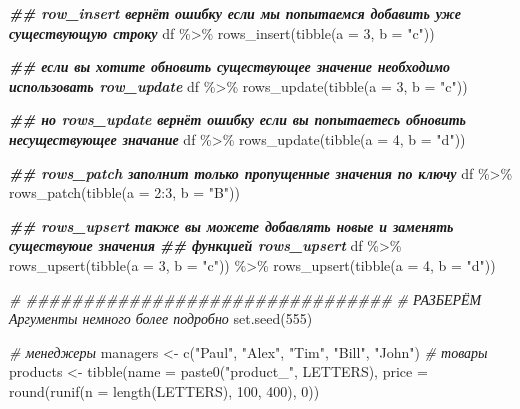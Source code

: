 \documentclass[
]{book}
\newenvironment{Shaded}{\begin{snugshade}}{\end{snugshade}}
\newcommand{\AttributeTok}[1]{\textcolor[rgb]{0.77,0.63,0.00}{#1}}
\newcommand{\CommentTok}[1]{\textcolor[rgb]{0.56,0.35,0.01}{\textit{#1}}}
\newcommand{\DecValTok}[1]{\textcolor[rgb]{0.00,0.00,0.81}{#1}}
\newcommand{\DocumentationTok}[1]{\textcolor[rgb]{0.56,0.35,0.01}{\textbf{\textit{#1}}}}
\newcommand{\FunctionTok}[1]{\textcolor[rgb]{0.00,0.00,0.00}{#1}}
\newcommand{\NormalTok}[1]{#1}
\newcommand{\OtherTok}[1]{\textcolor[rgb]{0.56,0.35,0.01}{#1}}
\newcommand{\SpecialCharTok}[1]{\textcolor[rgb]{0.00,0.00,0.00}{#1}}
\newcommand{\StringTok}[1]{\textcolor[rgb]{0.31,0.60,0.02}{#1}}
\begin{document}
\begin{Shaded}
\begin{Highlighting}[]
\DocumentationTok{\#\# row\_insert вернёт ошибку если мы попытаемся добавить уже существующую строку}
\NormalTok{df }\SpecialCharTok{\%\textgreater{}\%} \FunctionTok{rows\_insert}\NormalTok{(}\FunctionTok{tibble}\NormalTok{(}\AttributeTok{a =} \DecValTok{3}\NormalTok{, }\AttributeTok{b =} \StringTok{"c"}\NormalTok{))}

\DocumentationTok{\#\# если вы хотите обновить существующее значение необходимо использовать row\_update}
\NormalTok{df }\SpecialCharTok{\%\textgreater{}\%} \FunctionTok{rows\_update}\NormalTok{(}\FunctionTok{tibble}\NormalTok{(}\AttributeTok{a =} \DecValTok{3}\NormalTok{, }\AttributeTok{b =} \StringTok{"c"}\NormalTok{))}

\DocumentationTok{\#\# но rows\_update вернёт ошибку если вы попытаетесь обновить несуществующее значание}
\NormalTok{df }\SpecialCharTok{\%\textgreater{}\%} \FunctionTok{rows\_update}\NormalTok{(}\FunctionTok{tibble}\NormalTok{(}\AttributeTok{a =} \DecValTok{4}\NormalTok{, }\AttributeTok{b =} \StringTok{"d"}\NormalTok{))}

\DocumentationTok{\#\# rows\_patch заполнит только пропущенные значения по ключу}
\NormalTok{df }\SpecialCharTok{\%\textgreater{}\%} 
  \FunctionTok{rows\_patch}\NormalTok{(}\FunctionTok{tibble}\NormalTok{(}\AttributeTok{a =} \DecValTok{2}\SpecialCharTok{:}\DecValTok{3}\NormalTok{, }\AttributeTok{b =} \StringTok{"B"}\NormalTok{))}

\DocumentationTok{\#\# rows\_upsert также вы можете добавлять новые и заменять существуюие значения }
\DocumentationTok{\#\# функцией rows\_upsert}
\NormalTok{df }\SpecialCharTok{\%\textgreater{}\%} 
  \FunctionTok{rows\_upsert}\NormalTok{(}\FunctionTok{tibble}\NormalTok{(}\AttributeTok{a =} \DecValTok{3}\NormalTok{, }\AttributeTok{b =} \StringTok{"c"}\NormalTok{)) }\SpecialCharTok{\%\textgreater{}\%} 
  \FunctionTok{rows\_upsert}\NormalTok{(}\FunctionTok{tibble}\NormalTok{(}\AttributeTok{a =} \DecValTok{4}\NormalTok{, }\AttributeTok{b =} \StringTok{"d"}\NormalTok{))}

\CommentTok{\# \#\#\#\#\#\#\#\#\#\#\#\#\#\#\#\#\#\#\#\#\#\#\#\#\#\#\#\#\#\#\#\#}
\CommentTok{\# РАЗБЕРЁМ Аргументы немного более подробно}
\FunctionTok{set.seed}\NormalTok{(}\DecValTok{555}\NormalTok{)}

\CommentTok{\# менеджеры}
\NormalTok{managers }\OtherTok{\textless{}{-}} \FunctionTok{c}\NormalTok{(}\StringTok{"Paul"}\NormalTok{, }\StringTok{"Alex"}\NormalTok{, }\StringTok{"Tim"}\NormalTok{, }\StringTok{"Bill"}\NormalTok{, }\StringTok{"John"}\NormalTok{)}
\CommentTok{\# товары}
\NormalTok{products }\OtherTok{\textless{}{-}} \FunctionTok{tibble}\NormalTok{(}\AttributeTok{name  =} \FunctionTok{paste0}\NormalTok{(}\StringTok{"product\_"}\NormalTok{, LETTERS), }
                   \AttributeTok{price =} \FunctionTok{round}\NormalTok{(}\FunctionTok{runif}\NormalTok{(}\AttributeTok{n =} \FunctionTok{length}\NormalTok{(LETTERS), }\DecValTok{100}\NormalTok{, }\DecValTok{400}\NormalTok{), }\DecValTok{0}\NormalTok{))}


\end{Highlighting}
\end{Shaded}
\end{document}
